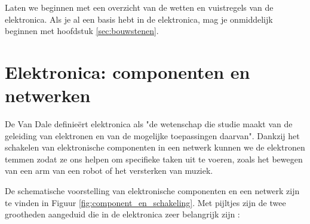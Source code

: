 \documentclass{article}
\begin{document}

		Laten we beginnen met een overzicht van de wetten en vuistregels van de elektronica. Als je al een basis hebt in de elektronica, mag je onmiddelijk beginnen met hoofdstuk \ref{sec:bouwstenen}.
	\section{Elektronica: componenten en netwerken}

		De Van Dale definie\"ert elektronica als "de wetenschap die studie maakt van de geleiding van elektronen en van de mogelijke toepassingen daarvan".
		Dankzij het schakelen van elektronische componenten in een netwerk kunnen we de elektronen temmen zodat ze ons helpen om specifieke taken uit te voeren, zoals het bewegen van een arm van een robot of het versterken van muziek.


		De schematische voorstelling van elektronische componenten en een netwerk zijn te vinden in Figuur \ref{fig:component_en_schakeling}. Met pijltjes zijn de twee grootheden aangeduid die in de elektronica zeer belangrijk zijn :
\end{document}
